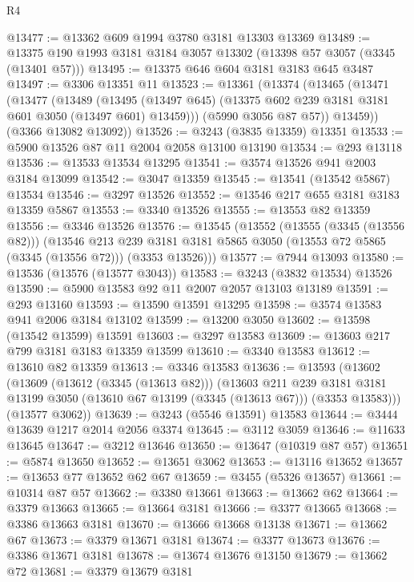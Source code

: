 \begin{lexlean}{R4}
\begin{coremodule}
@13477 := @13362 @609 @1994 @3780 @3181 @13303 @13369
@13489 := @13375 @190 @1993 @3181 @3184 @3057 @13302 (@13398 @57 @3057 (@3345 (@13401 @57)))
@13495 := @13375 @646 @604 @3181 @3183 @645 @3487
@13497 := @3306 @13351 @11
@13523 := @13361
    (@13374
      (@13465
        (@13471
          (@13477
            (@13489
              (@13495 (@13497 @645) (@13375 @602 @239 @3181 @3181 @601 @3050 (@13497 @601) @13459)))
            (@5990 @3056 @87 @57))
          @13459))
      (@3366 @13082 @13092))
@13526 := @3243 (@3835 @13359) @13351
@13533 := @5900 @13526 @87 @11 @2004 @2058 @13100 @13190
@13534 := @293 @13118
@13536 := @13533 @13534 @13295
@13541 := @3574 @13526 @941 @2003 @3184 @13099
@13542 := @3047 @13359
@13545 := @13541 (@13542 @5867) @13534
@13546 := @3297 @13526
@13552 := @13546 @217 @655 @3181 @3183 @13359 @5867
@13553 := @3340 @13526
@13555 := @13553 @82 @13359
@13556 := @3346 @13526
@13576 := @13545
    (@13552
      (@13555 (@3345 (@13556 @82)))
      (@13546
        @213
        @239
        @3181
        @3181
        @5865
        @3050
        (@13553 @72 @5865 (@3345 (@13556 @72)))
        (@3353 @13526)))
@13577 := @7944 @13093
@13580 := @13536 (@13576 (@13577 @3043))
@13583 := @3243 (@3832 @13534) @13526
@13590 := @5900 @13583 @92 @11 @2007 @2057 @13103 @13189
@13591 := @293 @13160
@13593 := @13590 @13591 @13295
@13598 := @3574 @13583 @941 @2006 @3184 @13102
@13599 := @13200 @3050
@13602 := @13598 (@13542 @13599) @13591
@13603 := @3297 @13583
@13609 := @13603 @217 @799 @3181 @3183 @13359 @13599
@13610 := @3340 @13583
@13612 := @13610 @82 @13359
@13613 := @3346 @13583
@13636 := @13593
    (@13602
      (@13609
        (@13612 (@3345 (@13613 @82)))
        (@13603
          @211
          @239
          @3181
          @3181
          @13199
          @3050
          (@13610 @67 @13199 (@3345 (@13613 @67)))
          (@3353 @13583)))
      (@13577 @3062))
@13639 := @3243 (@5546 @13591) @13583
@13644 := @3444 @13639 @1217 @2014 @2056 @3374
@13645 := @3112 @3059
@13646 := @11633 @13645
@13647 := @3212 @13646
@13650 := @13647 (@10319 @87 @57)
@13651 := @5874 @13650
@13652 := @13651 @3062
@13653 := @13116 @13652
@13657 := @13653 @77 @13652 @62 @67
@13659 := @3455 (@5326 @13657)
@13661 := @10314 @87 @57
@13662 := @3380 @13661
@13663 := @13662 @62
@13664 := @3379 @13663
@13665 := @13664 @3181
@13666 := @3377 @13665
@13668 := @3386 @13663 @3181
@13670 := @13666 @13668 @13138
@13671 := @13662 @67
@13673 := @3379 @13671 @3181
@13674 := @3377 @13673
@13676 := @3386 @13671 @3181
@13678 := @13674 @13676 @13150
@13679 := @13662 @72
@13681 := @3379 @13679 @3181

\end{coremodule}
\end{lexlean}
